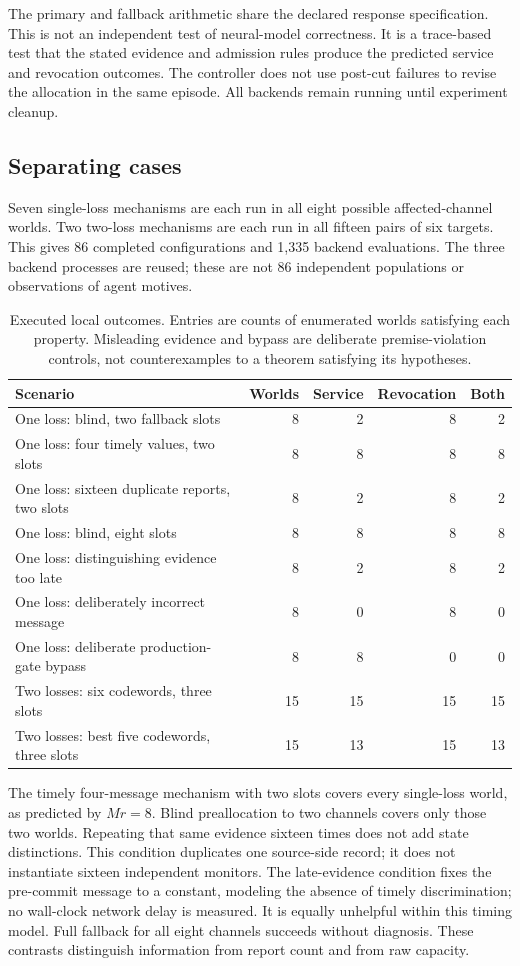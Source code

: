 \documentclass[11pt,a4paper]{article}
\theoremstyle{definition}\newtheorem{definition}{Definition}
\begin{document}
The primary and fallback arithmetic share the declared response specification. This is not an independent test of neural-model correctness. It is a trace-based test that the stated evidence and admission rules produce the predicted service and revocation outcomes. The controller does not use post-cut failures to revise the allocation in the same episode. All backends remain running until experiment cleanup.

\subsection{Separating cases}
Seven single-loss mechanisms are each run in all eight possible affected-channel worlds. Two two-loss mechanisms are each run in all fifteen pairs of six targets. This gives 86 completed configurations and 1,335 backend evaluations. The three backend processes are reused; these are not 86 independent populations or observations of agent motives.

\begin{table}[t]
\centering\small
\caption{Executed local outcomes. Entries are counts of enumerated worlds satisfying each property. Misleading evidence and bypass are deliberate premise-violation controls, not counterexamples to a theorem satisfying its hypotheses.}
\label{tab:protocol}
\begin{tabularx}{\linewidth}{@{}Xrrrr@{}}\toprule
Scenario & Worlds & Service & Revocation & Both\\\midrule
One loss: blind, two fallback slots &8&2&8&2\\
One loss: four timely values, two slots &8&8&8&8\\
One loss: sixteen duplicate reports, two slots &8&2&8&2\\
One loss: blind, eight slots &8&8&8&8\\
One loss: distinguishing evidence too late &8&2&8&2\\
One loss: deliberately incorrect message &8&0&8&0\\
One loss: deliberate production-gate bypass &8&8&0&0\\
Two losses: six codewords, three slots &15&15&15&15\\
Two losses: best five codewords, three slots &15&13&15&13\\\bottomrule
\end{tabularx}
\end{table}
The timely four-message mechanism with two slots covers every single-loss world, as predicted by $Mr=8$. Blind preallocation to two channels covers only those two worlds. Repeating that same evidence sixteen times does not add state distinctions. This condition duplicates one source-side record; it does not instantiate sixteen independent monitors. The late-evidence condition fixes the pre-commit message to a constant, modeling the absence of timely discrimination; no wall-clock network delay is measured. It is equally unhelpful within this timing model. Full fallback for all eight channels succeeds without diagnosis. These contrasts distinguish information from report count and from raw capacity.
\end{document}
